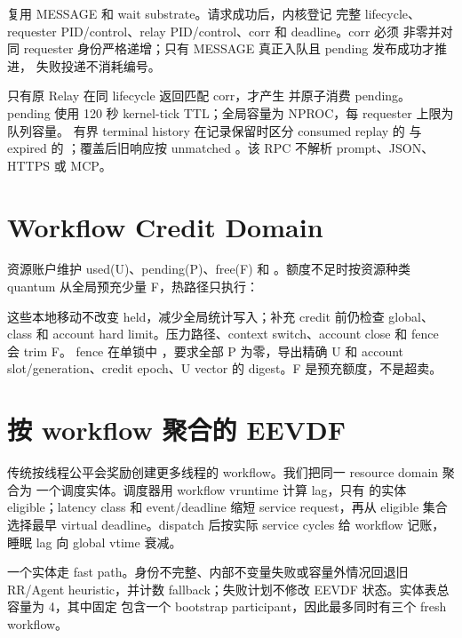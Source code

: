  复用 MESSAGE 和 wait substrate。请求成功后，内核登记
完整 lifecycle、requester PID/control、relay PID/control、corr 和 deadline。corr 必须
非零并对同 requester 身份严格递增；只有 MESSAGE 真正入队且 pending 发布成功才推进，
失败投递不消耗编号。

只有原 Relay 在同 lifecycle 返回匹配 corr，才产生  并原子消费 pending。
pending 使用 120 秒 kernel-tick TTL；全局容量为 NPROC，每 requester 上限为队列容量。
有界 terminal history 在记录保留时区分 consumed replay 的  与 expired 的
；覆盖后旧响应按 unmatched 。该 RPC 不解析 prompt、JSON、
HTTPS 或 MCP。

\section{Workflow Credit Domain}

资源账户维护 used(U)、pending(P)、free(F) 和 。额度不足时按资源种类
quantum 从全局预充少量 F，热路径只执行：

\begin{center}
\quad
{}\quad
{}\quad
{}
\end{center}

这些本地移动不改变 held，减少全局统计写入；补充 credit 前仍检查 global、class 和
account hard limit。压力路径、context switch、account close 和 fence 会 trim F。
fence 在单锁中 ，要求全部 P 为零，导出精确 U 和 account
slot/generation、credit epoch、U vector 的 digest。F 是预充额度，不是超卖。

\section{按 workflow 聚合的 EEVDF}

传统按线程公平会奖励创建更多线程的 workflow。我们把同一 resource domain 聚合为
一个调度实体。调度器用 workflow vruntime 计算 lag，只有
 的实体 eligible；latency class 和 event/deadline 缩短
service request，再从 eligible 集合选择最早 virtual deadline。dispatch 后按实际
service cycles 给 workflow 记账，睡眠 lag 向 global vtime 衰减。

一个实体走 fast path。身份不完整、内部不变量失败或容量外情况回退旧 RR/Agent
heuristic，并计数 fallback；失败计划不修改 EEVDF 状态。实体表总容量为 4，其中固定
包含一个  bootstrap participant，因此最多同时有三个 fresh workflow。

